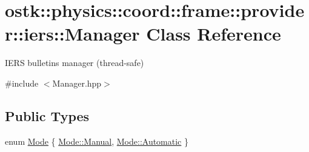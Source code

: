 \hypertarget{classostk_1_1physics_1_1coord_1_1frame_1_1provider_1_1iers_1_1_manager}{}\section{ostk\+:\+:physics\+:\+:coord\+:\+:frame\+:\+:provider\+:\+:iers\+:\+:Manager Class Reference}
\label{classostk_1_1physics_1_1coord_1_1frame_1_1provider_1_1iers_1_1_manager}


I\+E\+RS bulletins manager (thread-\/safe)  




{\ttfamily \#include $<$Manager.\+hpp$>$}

\subsection*{Public Types}
\begin{DoxyCompactItemize}
\item 
enum \hyperlink{classostk_1_1physics_1_1coord_1_1frame_1_1provider_1_1iers_1_1_manager_a3a8dd1081d1094069417687b4a3f16ba}{Mode} \{ \hyperlink{classostk_1_1physics_1_1coord_1_1frame_1_1provider_1_1iers_1_1_manager_a3a8dd1081d1094069417687b4a3f16baae1ba155a9f2e8c3be94020eef32a0301}{Mode\+::\+Manual}, 
\hyperlink{classostk_1_1physics_1_1coord_1_1frame_1_1provider_1_1iers_1_1_manager_a3a8dd1081d1094069417687b4a3f16baa086247a9b57fde6eefee2a0c4752242d}{Mode\+::\+Automatic}
 \}
\end{DoxyCompactItemize}
